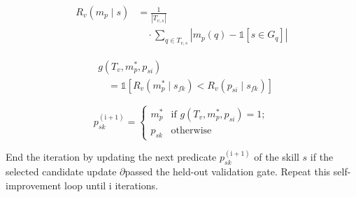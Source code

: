 \[\begin{aligned}R_v(m_p\mid s)&=\frac{1}{|T_{v,s}|}\\&\quad\cdot\sum_{q\in T_{v,s}}|m_p(q)-\mathds{1}[s\in G_q]|\end{aligned}\]

\[\begin{aligned}&g(T_v,m_p^*,p_{si})\\&\quad=\mathds{1}[R_v(m_p^*\mid s_{fk})< R_v(p_{si}\mid s_{fk})]\end{aligned}\]

\[p_{sk}^{\mathrm{(i+1)}}=\begin{cases}m_p^*&\text{if }g(T_v,m_p^*,p_{si})=1;\\p_{sk}&\text{otherwise}\end{cases}\]

End the iteration by updating the next predicate \(p_{sk}^{\mathrm{(i+1)}}\) of the skill \(s\) if the selected candidate update \(\partial\)passed the held-out validation gate. Repeat this self-improvement loop until i iterations.
